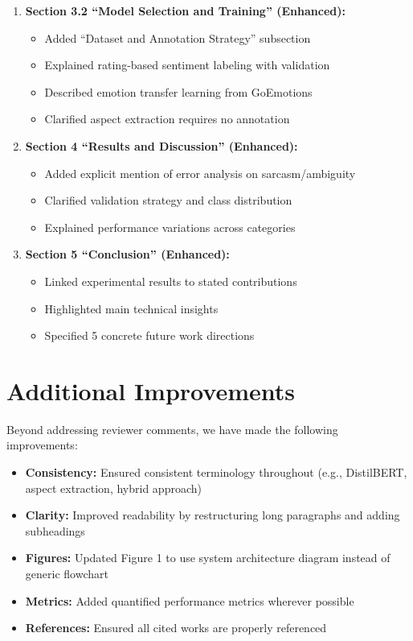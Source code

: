 \documentclass[11pt,a4paper]{article}
\begin{document}
\begin{enumerate}[leftmargin=*]
    \item \textbf{Section 3.2 ``Model Selection and Training'' (Enhanced):}
    \begin{itemize}
        \item Added ``Dataset and Annotation Strategy'' subsection
        \item Explained rating-based sentiment labeling with validation
        \item Described emotion transfer learning from GoEmotions
        \item Clarified aspect extraction requires no annotation
    \end{itemize}
    
    \item \textbf{Section 4 ``Results and Discussion'' (Enhanced):}
    \begin{itemize}
        \item Added explicit mention of error analysis on sarcasm/ambiguity
        \item Clarified validation strategy and class distribution
        \item Explained performance variations across categories
    \end{itemize}
    
    \item \textbf{Section 5 ``Conclusion'' (Enhanced):}
    \begin{itemize}
        \item Linked experimental results to stated contributions
        \item Highlighted main technical insights
        \item Specified 5 concrete future work directions
    \end{itemize}
\end{enumerate}

\vspace{12pt}

\section*{Additional Improvements}

Beyond addressing reviewer comments, we have made the following improvements:

\begin{itemize}[leftmargin=*]
    \item \textbf{Consistency:} Ensured consistent terminology throughout (e.g., DistilBERT, aspect extraction, hybrid approach)
    \item \textbf{Clarity:} Improved readability by restructuring long paragraphs and adding subheadings
    \item \textbf{Figures:} Updated Figure 1 to use system architecture diagram instead of generic flowchart
    \item \textbf{Metrics:} Added quantified performance metrics wherever possible
    \item \textbf{References:} Ensured all cited works are properly referenced
\end{itemize}
\end{document}
